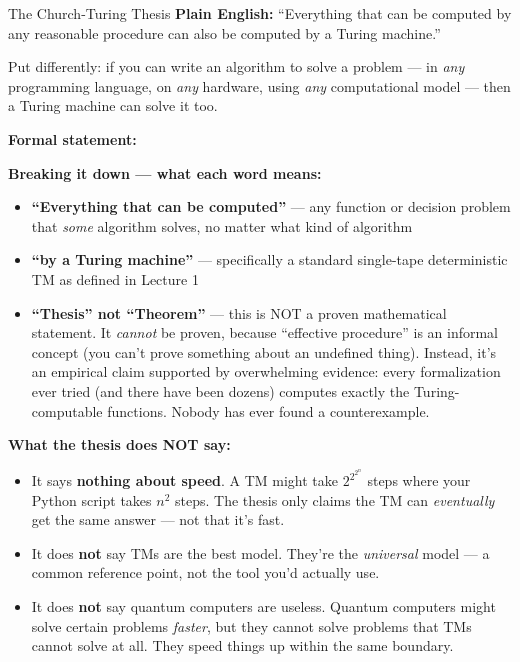 \begin{definitionbox}{The Church-Turing Thesis}
\textbf{Plain English:}
``Everything that can be computed by any reasonable procedure can also be
computed by a Turing machine.''

Put differently: if you can write an algorithm to solve a problem --- in
\emph{any} programming language, on \emph{any} hardware, using \emph{any}
computational model --- then a Turing machine can solve it too.

\textbf{Formal statement:}


\textbf{Breaking it down --- what each word means:}
\begin{itemize}[nosep]
\item \textbf{``Everything that can be computed''} --- any function or decision
  problem that \emph{some} algorithm solves, no matter what kind of algorithm
\item \textbf{``by a Turing machine''} --- specifically a standard single-tape
  deterministic TM as defined in Lecture 1
\item \textbf{``Thesis'' not ``Theorem''} --- this is NOT a proven mathematical
  statement. It \emph{cannot} be proven, because ``effective procedure'' is an
  informal concept (you can't prove something about an undefined thing).
  Instead, it's an empirical claim supported by overwhelming evidence: every
  formalization ever tried (and there have been dozens) computes exactly the
  Turing-computable functions. Nobody has ever found a counterexample.
\end{itemize}

\textbf{What the thesis does NOT say:}
\begin{itemize}[nosep]
\item It says \textbf{nothing about speed}. A TM might take $2^{2^{2^n}}$ steps
  where your Python script takes $n^2$ steps. The thesis only claims the TM
  can \emph{eventually} get the same answer --- not that it's fast.
\item It does \textbf{not} say TMs are the best model. They're the
  \emph{universal} model --- a common reference point, not the tool you'd
  actually use.
\item It does \textbf{not} say quantum computers are useless. Quantum computers
  might solve certain problems \emph{faster}, but they cannot solve problems
  that TMs cannot solve at all. They speed things up within the same boundary.
\end{itemize}
\end{definitionbox}

